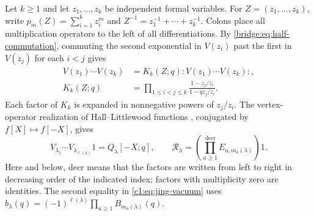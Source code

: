 \documentclass[12pt,reqno,a4paper]{amsart}
\numberwithin{equation}{section}
\numberwithin{figure}{section}
\theoremstyle{plain}
\theoremstyle{definition}
\begin{document}
Let $k\geq1$ and let $z_1,\ldots,z_k$ be independent formal variables.
For $Z=(z_1,\ldots,z_k)$, write
$p_m(Z)=\sum_{i=1}^kz_i^m$ and
$Z^{-1}=z_1^{-1}+\cdots+z_k^{-1}$.
Colons place all multiplication operators to the left of all
differentiations.  By \eqref{bridge:eq:half-commutation}, commuting
the second exponential in $V(z_i)$ past the first in $V(z_j)$ for
each $i<j$ gives
\begin{equation}\label{c1:eq:interaction-kernel}
 \begin{split}
 V(z_1)\cdots V(z_k)
 &=K_k(Z;q):V(z_1)\cdots V(z_k):,\\
 K_k(Z;q)&=\prod_{1\leq i<j\leq k}
            \frac{1-z_j/z_i}{1-qz_j/z_i}.
 \end{split}
\end{equation}
Each factor of $K_k$ is expanded in nonnegative powers of $z_j/z_i$.
The vertex-operator realization of Hall--Littlewood functions
\cite[Proposition~3.9, p.~243]{JingVertex}, conjugated by
$f[X]\mapsto f[-X]$, gives
\begin{equation}\label{c1:eq:jing-vacuum}
 V_{\lambda_1}\cdots V_{\lambda_{\ell(\lambda)}}1
 =Q_\lambda[-X;q],
 \qquad
 \mathcal R_\lambda
 =\left(\prod_{a\geq1}^{\mathrm{decr}}
          E_{a,m_a(\lambda)}\right)1.
\end{equation}
Here and below, $\mathrm{decr}$ means that the factors are written
from left to right in decreasing order of the indicated index;
factors with multiplicity zero are identities.  The second equality in
\eqref{c1:eq:jing-vacuum} uses
$b_\lambda(q)=(-1)^{\ell(\lambda)}
\prod_{a\geq1}B_{m_a(\lambda)}(q)$.
\end{document}
